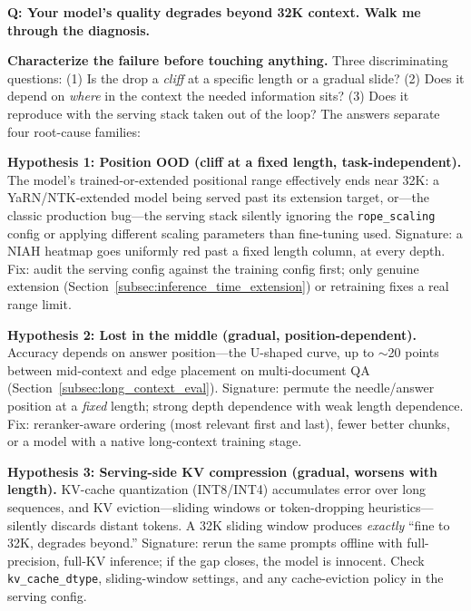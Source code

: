 \begin{interviewq}
\textbf{Q: Your model's quality degrades beyond 32K context. Walk me through the diagnosis.}

 \quad {} \quad \badgefreq{\freqmed}

\stronganswer

\textbf{Characterize the failure before touching anything.} Three discriminating questions: (1) Is the drop a \textit{cliff} at a specific length or a gradual slide? (2) Does it depend on \textit{where} in the context the needed information sits? (3) Does it reproduce with the serving stack taken out of the loop? The answers separate four root-cause families:

\textbf{Hypothesis 1: Position OOD (cliff at a fixed length, task-independent).} The model's trained-or-extended positional range effectively ends near 32K: a YaRN/NTK-extended model being served past its extension target, or---the classic production bug---the serving stack silently ignoring the \texttt{rope\_scaling} config or applying different scaling parameters than fine-tuning used. Signature: a NIAH heatmap goes uniformly red past a fixed length column, at every depth. Fix: audit the serving config against the training config first; only genuine extension (Section~\ref{subsec:inference_time_extension}) or retraining fixes a real range limit.

\textbf{Hypothesis 2: Lost in the middle (gradual, position-dependent).} Accuracy depends on answer position---the U-shaped curve, up to $\sim$20 points between mid-context and edge placement on multi-document QA (Section~\ref{subsec:long_context_eval}). Signature: permute the needle/answer position at a \textit{fixed} length; strong depth dependence with weak length dependence. Fix: reranker-aware ordering (most relevant first and last), fewer better chunks, or a model with a native long-context training stage.

\textbf{Hypothesis 3: Serving-side KV compression (gradual, worsens with length).} KV-cache quantization (INT8/INT4) accumulates error over long sequences, and KV eviction---sliding windows or token-dropping heuristics---silently discards distant tokens. A 32K sliding window produces \textit{exactly} ``fine to 32K, degrades beyond.'' Signature: rerun the same prompts offline with full-precision, full-KV inference; if the gap closes, the model is innocent. Check \texttt{kv\_cache\_dtype}, sliding-window settings, and any cache-eviction policy in the serving config.


\end{interviewq}
